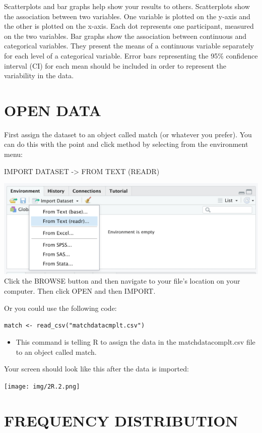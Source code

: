 \documentclass[
]{book}
\providecommand{\tightlist}{%
  \setlength{\itemsep}{0pt}\setlength{\parskip}{0pt}}
\begin{document}
Scatterplots and bar graphs help show your results to others. Scatterplots show the association between two variables. One variable is plotted on the y-axis and the other is plotted on the x-axis. Each dot represents one participant, measured on the two variables. Bar graphs show the association between continuous and categorical variables. They present the means of a continuous variable separately for each level of a categorical variable. Error bars representing the 95\% confidence interval (CI) for each mean should be included in order to represent the variability in the data.

\hypertarget{open-data}{%
\section{OPEN DATA}\label{open-data}}

First assign the dataset to an object called match (or whatever you prefer). You can do this with the point and click method by selecting from the environment menu:

IMPORT DATASET -\textgreater{} FROM TEXT (READR)

\includegraphics{img/2R.1.png}
Click the BROWSE button and then navigate to your file's location on your computer. Then click OPEN and then IMPORT.

Or you could use the following code:

\texttt{match\ \textless{}-\ read\_csv("matchdatacmplt.csv")}

\begin{itemize}
\tightlist
\item
  This command is telling R to assign the data in the matchdatacomplt.csv file to an object called match.
\end{itemize}

Your screen should look like this after the data is imported:

\texttt{[image: img/2R.2.png]}

\hypertarget{frequency-distribution}{%
\section{FREQUENCY DISTRIBUTION}\label{frequency-distribution}}
\end{document}
